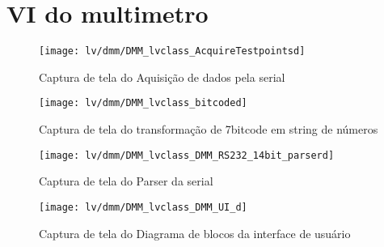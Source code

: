             
\section{VI do multimetro}
  
            \begin{comment}
            \begin{figure}
                \centering
                \texttt{[image: lv/dmm/DMM\_lvclass\_Actor\_Cored]}
                \caption{Captura de tela do Actor Core do Multimetro}
                \label{fig:dmmcore}
            \end{figure}
            
            \end{comment}
            \begin{figure}
                \centering
                 \texttt{[image: lv/dmm/DMM\_lvclass\_AcquireTestpointsd]}
                \caption{Captura de tela do Aquisição de dados pela serial}
                \label{fig:dmmacq}
            \end{figure}
            
            
            \begin{figure}
                \centering
                \texttt{[image: lv/dmm/DMM\_lvclass\_bitcoded]}
                \caption{Captura de tela do transformação de 7bitcode em string de números}
                \label{fig:dmmbitcode}
            \end{figure}
            
            
            \begin{figure}
                \centering
                \texttt{[image: lv/dmm/DMM\_lvclass\_DMM\_RS232\_14bit\_parserd]}
                \caption{Captura de tela do Parser da serial}
                \label{fig:dmmparser}
            \end{figure}
            
            
            \begin{figure}
                \centering
                \texttt{[image: lv/dmm/DMM\_lvclass\_DMM\_UI\_d]}
                \caption{Captura de tela do Diagrama de blocos da interface de usuário}
                \label{fig:dmmfpbd}
            \end{figure}